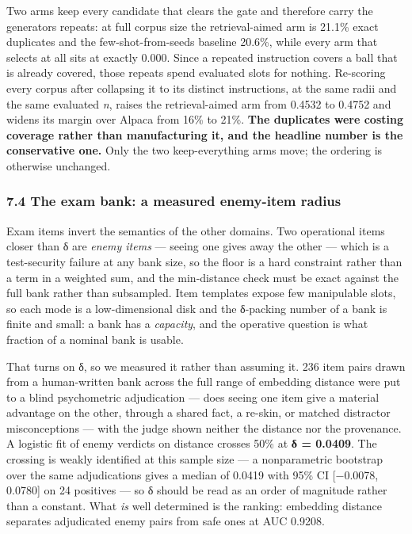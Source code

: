 \documentclass[
  10pt,
]{article}
\theoremstyle{plain}
\theoremstyle{definition}
\begin{document}
Two arms keep every candidate that clears the gate and therefore carry
the generator\textquotesingle s repeats: at full corpus size the
retrieval-aimed arm is 21.1\% exact duplicates and the
few-shot-from-seeds baseline 20.6\%, while every arm that selects at all
sits at exactly 0.000. Since a repeated instruction covers a ball that
is already covered, those repeats spend evaluated slots for nothing.
Re-scoring every corpus after collapsing it to its distinct
instructions, at the same radii and the same evaluated \emph{n}, raises
the retrieval-aimed arm from 0.4532 to 0.4752 and widens its margin over
Alpaca from 16\% to 21\%. \textbf{The duplicates were costing coverage
rather than manufacturing it, and the headline number is the
conservative one.} Only the two keep-everything arms move; the ordering
is otherwise unchanged.

\subsubsection{7.4 The exam bank: a measured enemy-item
radius}\label{74-the-exam-bank-a-measured-enemy-item-radius}

Exam items invert the semantics of the other domains. Two operational
items closer than δ are \emph{enemy items} --- seeing one gives away the
other --- which is a test-security failure at any bank size, so the
floor is a hard constraint rather than a term in a weighted sum, and the
min-distance check must be exact against the full bank rather than
subsampled. Item templates expose few manipulable slots, so each mode is
a low-dimensional disk and the δ-packing number of a bank is finite and
small: a bank has a \emph{capacity}, and the operative question is what
fraction of a nominal bank is usable.

That turns on δ, so we measured it rather than assuming it. 236 item
pairs drawn from a human-written bank across the full range of embedding
distance were put to a blind psychometric adjudication --- does seeing
one item give a material advantage on the other, through a shared fact,
a re-skin, or matched distractor misconceptions --- with the judge shown
neither the distance nor the provenance. A logistic fit of enemy
verdicts on distance crosses 50\% at \textbf{δ = 0.0409}. The crossing
is weakly identified at this sample size --- a nonparametric bootstrap
over the same adjudications gives a median of 0.0419 with 95\% CI
{[}−0.0078, 0.0780{]} on 24 positives --- so δ should be read as an
order of magnitude rather than a constant. What \emph{is} well
determined is the ranking: embedding distance separates adjudicated
enemy pairs from safe ones at AUC 0.9208.
\end{document}
